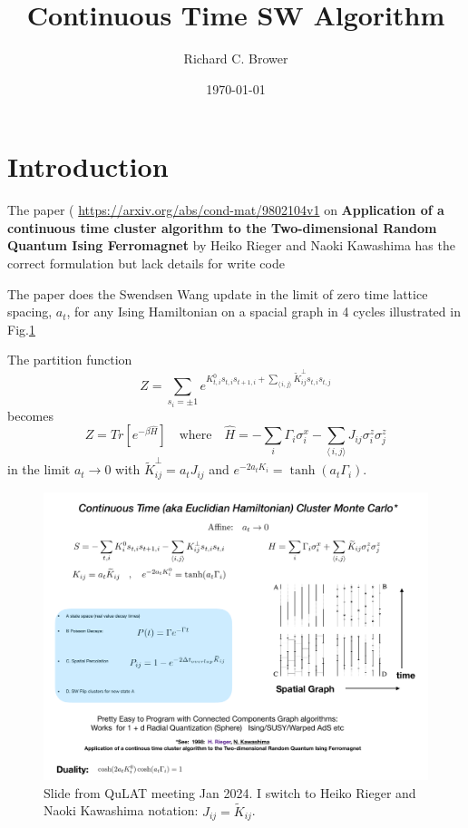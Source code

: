 \documentclass[12pt]{article}
\title{Continuous Time SW Algorithm}
\author[*]{Richard C. Brower}
\date{\today}
\numberwithin{equation}{section}
\numberwithin{figure}{section}
\newcommand{\be}{\begin{equation}}
\newcommand{\ee}{\end{equation}}
\newcommand{\<}{\langle\,}
\renewcommand{\>}{\rangle}
\begin{document}
\maketitle

\section{Introduction}

The paper ( \href{https://arxiv.org/abs/cond-mat/9802104v1}{https://arxiv.org/abs/cond-mat/9802104v1}   on {\bf Application of a continuous time cluster algorithm to the Two-dimensional Random Quantum Ising Ferromagnet} by Heiko Rieger and  Naoki Kawashima has the correct formulation but  lack details for write code

The paper does the Swendsen Wang update in the limit of zero time
lattice spacing, $a_t$,
for any Ising Hamiltonian on a spacial graph in 4 cycles illustrated
in Fig.\ref{fig:ABCD}

The partition function
\be
Z = \sum_{s_i = \pm 1} e^{\textstyle  K^0_{t,i}  s_{t,i}   s_{t+1,i} + \sum_{\<i,j\>} \widetilde K^\perp_{ij} s_{t,i}   s_{t,j}} 
\ee
becomes 
\be
Z =Tr[ e^{ -  \beta \hat H} ] \quad \mbox{where} \quad  \hat H   = - \sum_i \Gamma_i
\sigma^x_i -  \sum_{\<i,j\>}  J_{ij} \sigma^z_i \sigma^z_j 
\ee
in the limit $a_t \rightarrow 0$  with $\widetilde K^\perp_{ij} = a_t  J_{ij}$ and $e^{ - 2 a_t K_i} = \tanh(a_t \Gamma_i)$.

\begin{figure}[h]
    \centering
    \includegraphics[width=1.1\textwidth]{QuLat_Jan_2024_final}
    \caption{Slide from QuLAT meeting Jan 2024. I switch to Heiko Rieger and  Naoki Kawashima notation: $J_{ij} = \widetilde K_{ij}$. }
    \label{fig:ABCD}
  \end{figure}
  
\end{document}
